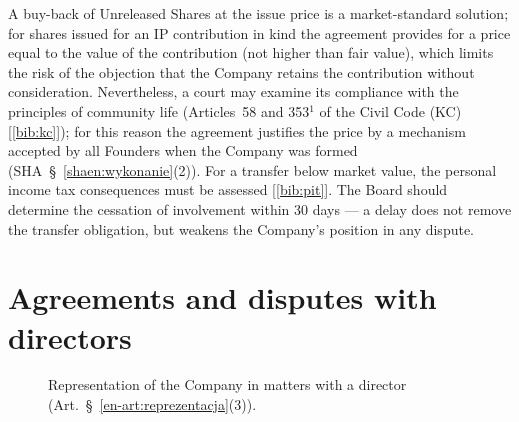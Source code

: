 \documentclass[11pt,a4paper]{report}
\newcommand{\Zr}[1]{[\ref{bib:#1}]}
\begin{document}
\begin{Komentarz}
A buy-back of Unreleased Shares at the issue price is a market-standard solution; for shares issued for an IP contribution in kind the agreement provides for a price equal to the value of the contribution (not higher than fair value), which limits the risk of the objection that the Company retains the contribution without consideration. Nevertheless, a court may examine its compliance with the principles of community life (Articles~58 and 353$^{1}$ of the Civil Code (KC) \Zr{kc}); for this reason the agreement justifies the price by a mechanism accepted by all Founders when the Company was formed (SHA~\S~\ref{shaen:wykonanie}(2)). For a transfer below market value, the personal income tax consequences must be assessed \Zr{pit}. The Board should determine the cessation of involvement within 30 days --- a delay does not remove the transfer obligation, but weakens the Company's position in any dispute.
\end{Komentarz}

\section{Agreements and disputes with directors}

\begin{figure}[H]
\centering
{}
\caption{Representation of the Company in matters with a director (Art.~\S~\ref{en-art:reprezentacja}(3)).}
\end{figure}
\end{document}
